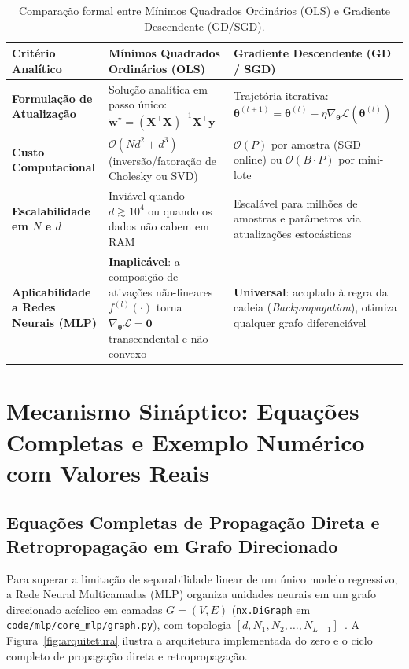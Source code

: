 ﻿\documentclass[runningheads]{llncs}
\begin{document}
\begin{table}[htbp]
\centering
\caption{Compara\c{c}\~{a}o formal entre M\'{i}nimos Quadrados Ordin\'{a}rios (OLS) e Gradiente Descendente (GD/SGD).}
\label{tab:ols_vs_gd}
\scriptsize
\begin{tabular}{p{2.7cm}p{4.4cm}p{4.7cm}}
\toprule
\textbf{Crit\'{e}rio Anal\'{i}tico} & \textbf{M\'{i}nimos Quadrados Ordin\'{a}rios (OLS)} & \textbf{Gradiente Descendente (GD / SGD)} \\
\midrule
\textbf{Formula\c{c}\~{a}o de Atualiza\c{c}\~{a}o} & Solu\c{c}\~{a}o anal\'{i}tica em passo \'{u}nico: $\tilde{\mathbf{w}}^\star = (\mathbf{X}^\top\mathbf{X})^{-1}\mathbf{X}^\top\mathbf{y}$ & Trajet\'{o}ria iterativa: $\boldsymbol{\theta}^{(t+1)} = \boldsymbol{\theta}^{(t)} - \eta \nabla_{\boldsymbol{\theta}} \mathcal{L}(\boldsymbol{\theta}^{(t)})$ \\
\textbf{Custo Computacional} & $\mathcal{O}(N d^2 + d^3)$ (invers\~{a}o/fatora\c{c}\~{a}o de Cholesky ou SVD) & $\mathcal{O}(P)$ por amostra (SGD online) ou $\mathcal{O}(B \cdot P)$ por mini-lote \\
\textbf{Escalabilidade em $N$ e $d$} & Invi\'{a}vel quando $d \gtrsim 10^4$ ou quando os dados n\~{a}o cabem em RAM & Escal\'{a}vel para milh\~{o}es de amostras e par\^{a}metros via atualiza\c{c}\~{o}es estoc\'{a}sticas \\
\textbf{Aplicabilidade a Redes Neurais (MLP)} & \textbf{Inaplic\'{a}vel}: a composi\c{c}\~{a}o de ativa\c{c}\~{o}es n\~{a}o-lineares $f^{(l)}(\cdot)$ torna $\nabla_{\boldsymbol{\theta}} \mathcal{L} = \mathbf{0}$ transcendental e n\~{a}o-convexo & \textbf{Universal}: acoplado \`{a} regra da cadeia (\textit{Backpropagation}), otimiza qualquer grafo diferenci\'{a}vel \\
\bottomrule
\end{tabular}
\end{table}

\section{Mecanismo Sin\'{a}ptico: Equa\c{c}\~{o}es Completas e Exemplo Num\'{e}rico com Valores Reais}
\label{sec:mecanismo}

\subsection{Equa\c{c}\~{o}es Completas de Propaga\c{c}\~{a}o Direta e Retropropaga\c{c}\~{a}o em Grafo Direcionado}
Para superar a limita\c{c}\~{a}o de separabilidade linear de um \'{u}nico modelo regressivo, a Rede Neural Multicamadas (MLP) organiza unidades neurais em um grafo direcionado ac\'{i}clico em camadas $G = (V, E)$ (\texttt{nx.DiGraph} em \texttt{code/mlp/core\_mlp/graph.py}), com topologia $[d, N_1, N_2, \dots, N_{L-1}]$~\cite{rumelhart1986learning,cybenko1989approximation}. A Figura~\ref{fig:arquitetura} ilustra a arquitetura implementada do zero e o ciclo completo de propaga\c{c}\~{a}o direta e retropropaga\c{c}\~{a}o.
\end{document}

